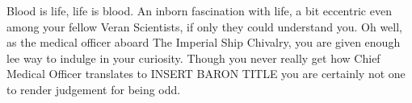 \documentclass[char]{guildcamp4}
\begin{document}
\name{\cVthree{}}

Blood is life, life is blood.
An inborn fascination with life, a bit eccentric even among your fellow Veran Scientists, if only they could understand you. Oh well, as the 
medical officer aboard The Imperial Ship Chivalry, you are given enough lee way to indulge in your curiosity. Though you never really get how 
Chief Medical Officer translates to INSERT BARON TITLE you are certainly not one to render judgement for being odd.


\begin{itemz}[Goals]
	\item 
\end{itemz}

\begin{itemz}[Notes]
	\item 
\end{itemz}

\begin{contacts}
\end{contacts}
\end{document}
